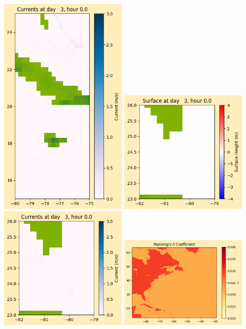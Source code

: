 \documentclass[11pt]{article}
\begin{document}
\includegraphics[width=0.475\textwidth]{frame0024fig1008.png}
\vskip 10pt 
\includegraphics[width=0.475\textwidth]{frame0024fig1009.png}
\includegraphics[width=0.475\textwidth]{frame0024fig1010.png}
\vskip 10pt 
\includegraphics[width=0.475\textwidth]{frame0024fig1011.png}
\end{document}
